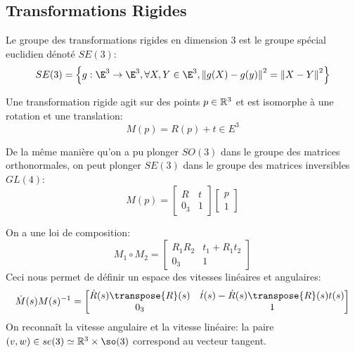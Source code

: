 \documentclass[math]{cours}
\begin{document}
\subsection{Transformations Rigides}
\begin{definition}
	Le groupe des transformations rigides en dimension $3$ est le groupe spécial euclidien dénoté $SE(3)$:
	\begin{equation*}
		SE(3) = \left\{g: \E^{3} \to \E^{3}, \forall X, Y\in \E^{3}, \norm{g(X) - g(y)}^{2} = \norm{X - Y}^{2}\right\}
	\end{equation*}
	\label{def:SE3}
\end{definition}

\begin{proposition}
	Une transformation rigide agit sur des points $p \in \mathbb{R}^{3}$ et est isomorphe à une rotation et une translation:
	\begin{equation*}
		M(p) = R(p) + t\in E^{3}
	\end{equation*}
	\label{prop:decompos}
\end{proposition}

De la même manière qu'on a pu plonger $SO(3)$ dans le groupe des matrices orthonormales, on peut plonger $SE(3)$ dans le groupe des matrices inversibles $GL(4)$:
\begin{equation*}
	M(p) = \begin{bmatrix}
		R     & t \\
		0_{3} & 1
	\end{bmatrix}
	\begin{bmatrix}
		p \\
		1
	\end{bmatrix}
\end{equation*}

On a une loi de composition:
\begin{equation*}
	M_{1} \circ M_{2} = \begin{bmatrix}
		R_{1}R_{2} & t_{1} + R_{1}t_{2} \\
		0_{3}      & 1
	\end{bmatrix}
\end{equation*}
Ceci nous permet de définir un espace des vitesses linéaires et angulaires:
\begin{equation*}
	\dot{M}(s)M(s)^{-1} = \begin{bmatrix}
		\dot{R}(s)\transpose{R}(s) & \dot{t}(s) - \dot{R}(s)\transpose{R}(s)t(s) \\
		0_{3}                      & 1
	\end{bmatrix}
\end{equation*}
On reconnaît la vitesse angulaire et la vitesse linéaire:
la paire $(v, w) \in se(3) \simeq \R^{3} \times \so(3)$ correspond au vecteur tangent.
\end{document}
